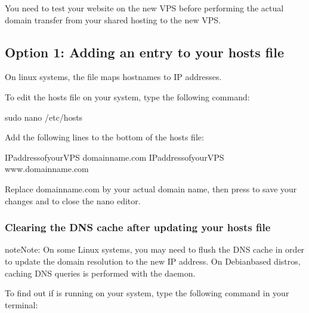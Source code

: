 \documentclass[letterpaper,10pt,english]{sphinxmanual}
\begin{document}
\sphinxAtStartPar
You need to test your website on the new VPS before performing the actual domain transfer from your shared hosting to the new VPS.


\subsection{Option 1: Adding an entry to your hosts file}
\label{\detokenize{joomla-to-vps:option-1-adding-an-entry-to-your-hosts-file}}
\sphinxAtStartPar
On linux systems, the  file maps hostnames to IP addresses.

\sphinxAtStartPar
To edit the hosts file on your system, type the following command:

\begin{sphinxVerbatim}[commandchars=\\\{\}]
\PYGZdl{} sudo nano /etc/hosts
\end{sphinxVerbatim}

\sphinxAtStartPar
Add the following lines to the bottom of the hosts file:

\begin{sphinxVerbatim}[commandchars=\\\{\},numbers=left,firstnumber=1,stepnumber=1]
IP\PYGZus{}address\PYGZus{}of\PYGZus{}your\PYGZus{}VPS  domainname.com
IP\PYGZus{}address\PYGZus{}of\PYGZus{}your\PYGZus{}VPS  www.domainname.com
\end{sphinxVerbatim}

\sphinxAtStartPar
Replace domainname.com by your actual domain name, then press  to save your changes and  to close the nano editor.


\subsubsection{Clearing the DNS cache after updating your hosts file}
\label{\detokenize{joomla-to-vps:clearing-the-dns-cache-after-updating-your-hosts-file}}
\begin{sphinxadmonition}{note}{Note:}
\sphinxAtStartPar
On some Linux systems, you may need to flush the DNS cache in order to update the domain resolution to the new IP address. On Debian\sphinxhyphen{}based distros, caching DNS queries is performed with the  daemon.
\end{sphinxadmonition}

\sphinxAtStartPar
To find out if  is running on your system, type the following command in your terminal:
\end{document}
